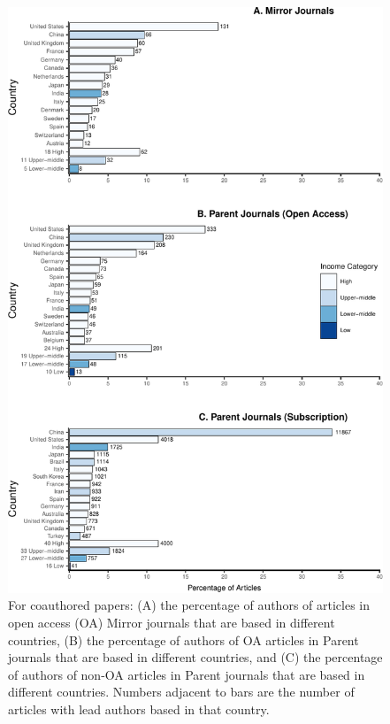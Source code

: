 \documentclass[
  english,
  man]{apa6}
\begin{document}
\begin{figure}

{\centering \includegraphics{Smith_etal_QSS_files/figure-latex/Fig2-1} 

}

\caption{For coauthored papers: (A) the percentage of authors of articles in open access (OA) Mirror journals that are based in different countries, (B) the percentage of authors of OA articles in Parent journals that are based in different countries, and (C) the percentage of authors of non-OA articles in Parent journals that are based in different countries. Numbers adjacent to bars are the number of articles with lead authors based in that country.}\label{fig:Fig2}
\end{figure}
\end{document}
